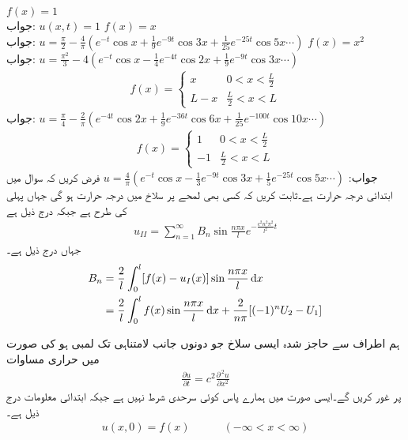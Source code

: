 \quad
$f(x)=1$\\
جواب:\quad
$u(x,t)=1$
\quad
$f(x)=x$\\
جواب:\quad
$u=\tfrac{\pi}{2}-\tfrac{4}{\pi}(e^{-t}\cos x+\tfrac{1}{9}e^{-9t}\cos 3x+\tfrac{1}{25}e^{-25t}\cos 5x\cdots)$
\quad
$f(x)=x^2$\\
جواب:\quad
$u=\tfrac{\pi^2}{3}-4(e^{-t}\cos x-\tfrac{1}{4}e^{-4t}\cos 2x+\tfrac{1}{9}e^{-9t}\cos 3x\cdots)$
\quad
\begin{align*}
f(x)=
\begin{cases}
x&0<x<\tfrac{L}{2}\\
L-x&\tfrac{L}{2}<x<L
\end{cases}
\end{align*}
جواب:\quad
$u=\tfrac{\pi}{4}-\tfrac{2}{\pi}(e^{-4t}\cos 2x+\tfrac{1}{9}e^{-36t}\cos 6x+\tfrac{1}{25}e^{-100t}\cos 10x\cdots)$
\quad
\begin{align*}
f(x)=
\begin{cases}
1&0<x<\tfrac{L}{2}\\
-1&\tfrac{L}{2}<x<L
\end{cases}
\end{align*}
جواب:\quad
$u=\tfrac{4}{\pi}(e^{-t}\cos x-\tfrac{1}{3}e^{-9t}\cos 3x+\tfrac{1}{5}e^{-25t}\cos 5x\cdots)$
\quad 
فرض کریں کہ سوال  میں ابتدائی درجہ حرارت  ہے۔ثابت کریں کہ کسی بھی لمحے پر سلاخ میں درجہ حرارت  ہو گی جہاں  پہلی کی طرح ہے جبکہ  درج ذیل ہے
\begin{align*}
u_{II}=\sum_{n=1}^{\infty} B_n\sin\frac{n\pi x}{l}e^{-\tfrac{c^2n^2\pi^2}{l^2}t}
\end{align*}
جہاں  درج ذیل ہے۔
\begin{align*}
B_n&=\frac{2}{l}\int_0^l [f(x)-u_I(x)]\sin \frac{n\pi x}{l}\dif x\\
&=\frac{2}{l}\int_0^l f(x)\sin \frac{n\pi x}{l}\dif x+\frac{2}{n\pi}[(-1)^nU_2-U_1]
\end{align*}

ہم اطراف سے حاجز شدہ ایسی سلاخ جو دونوں جانب لامتناہی تک لمبی ہو کی صورت میں حراری مساوات
\begin{align}\label{مساوات_جزوی_حراری_لامتناہی_الف}
\frac{\partial u}{\partial t}=c^2\frac{\partial^{\,2}u}{\partial x^2}
\end{align}
پر غور کریں گے۔ایسی صورت میں ہمارے پاس کوئی سرحدی شرط نہیں ہے جبکہ ابتدائی معلومات درج ذیل ہے۔
\begin{align}\label{مساوات_جزوی_حراری_لامتناہی_ب}
u(x,0)=f(x)\quad \quad \quad (-\infty<x<\infty)
\end{align}

